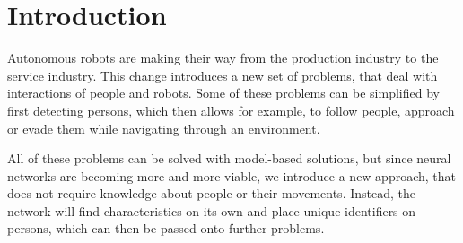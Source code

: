 \section{Introduction}

Autonomous robots are making their way from the production industry to the service industry. This change introduces a new set of problems, that deal with interactions of people and robots. Some of these problems can be simplified by first detecting persons, which then allows for example, to follow people, approach or evade them while navigating through an environment.

All of these problems can be solved with model-based solutions, but since neural networks are becoming more and more viable, we introduce a new approach, that does not require knowledge about people or their movements. Instead, the network will find characteristics on its own and place unique identifiers on persons, which can then be passed onto further problems.